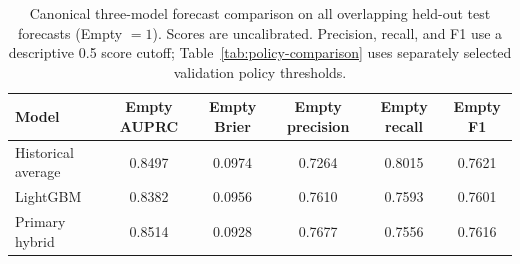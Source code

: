 \begin{table}[!t]
\caption{Canonical three-model forecast comparison on all overlapping held-out test forecasts (Empty $=1$). Scores are uncalibrated. Precision, recall, and F1 use a descriptive 0.5 score cutoff; Table~\ref{tab:policy-comparison} uses separately selected validation policy thresholds.}
\label{tab:primary-comparison}
\centering
\small
\begin{tabular}{lccccc}
\toprule
Model & Empty AUPRC & Empty Brier & Empty precision & Empty recall & Empty F1 \\
\midrule
Historical average & 0.8497 & 0.0974 & 0.7264 & 0.8015 & 0.7621 \\
LightGBM & 0.8382 & 0.0956 & 0.7610 & 0.7593 & 0.7601 \\
Primary hybrid & 0.8514 & 0.0928 & 0.7677 & 0.7556 & 0.7616 \\
\bottomrule
\end{tabular}
\end{table}
